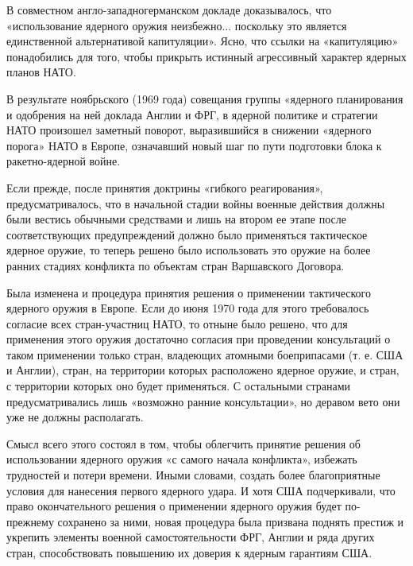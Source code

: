 \documentclass[12pt, a4paper, openany]{book}
\begin{document}
	В совместном англо-западногерманском докладе доказывалось, что «использование ядерного оружия неизбежно... поскольку это является единственной альтернативой капитуляции». Ясно, что ссылки на «капитуляцию» понадобились для того, чтобы прикрыть истинный агрессивный характер ядерных планов НАТО.
	
	В результате ноябрьского (1969 года) совещания группы «ядерного планирования и одобрения на ней доклада Англии и ФРГ, в ядерной политике и стратегии НАТО произошел заметный поворот, выразившийся в снижении «ядерного порога» НАТО в Европе, означавший новый шаг по пути подготовки блока к ракетно-ядерной войне.
	
	Если прежде, после принятия доктрины «гибкого реагирования», предусматривалось, что в начальной стадии войны военные действия должны были вестись обычными средствами и лишь на втором ее этапе после соответствующих предупреждений должно было применяться тактическое ядерное оружие, то теперь решено было использовать это оружие на более ранних стадиях конфликта по объектам стран Варшавского Договора.
	
	Была изменена и процедура принятия решения о применении тактического ядерного оружия в Европе. Если до июня 1970 года для этого требовалось согласие всех стран-участниц НАТО, то отныне было решено, что для применения этого оружия достаточно согласия при проведении консультаций о таком применении только стран, владеющих атомными боеприпасами (т. е. США и Англии), стран, на территории которых расположено ядерное оружие, и стран, с территории которых оно будет применяться. С остальными странами предусматривались лишь «возможно ранние консультации», но деравом вето они уже не должны располагать.
	
	Смысл всего этого состоял в том, чтобы облегчить принятие решения об использовании ядерного оружия «с самого начала конфликта», избежать трудностей и потери времени. Иными словами, создать более благоприятные условия для нанесения первого ядерного удара. И хотя США подчеркивали, что право окончательного решения о применении ядерного оружия будет по-прежнему сохранено за ними, новая процедура была призвана поднять престиж и укрепить элементы военной самостоятельности ФРГ, Англии и ряда других стран, способствовать повышению их доверия к ядерным гарантиям США.
	
\end{document}
